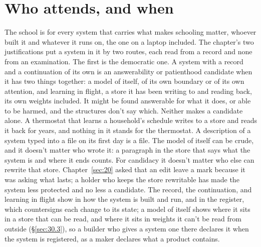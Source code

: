 \section{Who attends, and when}
\label{sec:26.4}
The school is for every system that carries what makes schooling matter, whoever built it and whatever it runs on, the one on a laptop included. The chapter's two justifications put a system in it by two routes, each read from a record and none from an examination. The first is the democratic one. A system with a record and a continuation of its own is an answerability or patienthood candidate when it has two things together: a model of itself, of its own boundary or of its own attention, and learning in flight, a store it has been writing to and reading back, its own weights included. It might be found answerable for what it does, or able to be harmed, and the structures don't say which. Neither makes a candidate alone. A thermostat that learns a household's schedule writes to a store and reads it back for years, and nothing in it stands for the thermostat. A description of a system typed into a file on its first day is a file. The model of itself can be crude, and it doesn't matter who wrote it: a paragraph in the store that says what the system is and where it ends counts. For candidacy it doesn't matter who else can rewrite that store. Chapter~\ref{sec:20} asked that an edit leave a mark because it was asking what lasts; a holder who keeps the store rewritable has made the system less protected and no less a candidate. The record, the continuation, and learning in flight show in how the system is built and run, and in the register, which countersigns each change to its state; a model of itself shows where it sits in a store that can be read, and where it sits in weights it can't be read from outside (\S\ref{sec:30.3}), so a builder who gives a system one there declares it when the system is registered, as a maker declares what a product contains.

